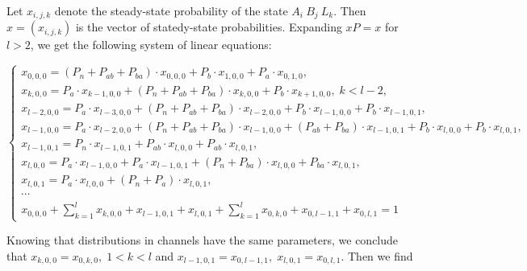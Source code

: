 Let $x_{i,j,k}$ denote the steady-state probability of the state $A_i \: B_j \: L_k$. Then $x = (x_{i,j,k})$ is the vector of statedy-state probabilities. Expanding $xP = x$ for $l>2$, we get the following system of linear equations:

\begin{equation}
\begin{cases}
    x_{0,0,0} = (P_n+P_{ab}+P_{ba}) \cdot x_{0,0,0} + P_b \cdot x_{1,0,0} + P_a \cdot x_{0,1,0},\\
    x_{k,0,0} = P_a \cdot x_{k-1,0,0} + (P_n+P_{ab}+P_{ba}) \cdot x_{k,0,0} + P_b \cdot x_{k+1,0,0}, \; k < l-2,\\
    x_{l-2,0,0} = P_a \cdot x_{l-3,0,0} + (P_n+P_{ab}+P_{ba}) \cdot x_{l-2,0,0} + P_b \cdot x_{l-1,0,0} + P_b \cdot x_{l-1,0,1},\\
    x_{l-1,0,0} = P_a \cdot x_{l-2,0,0} + (P_n+P_{ab}+P_{ba}) \cdot x_{l-1,0,0} + (P_{ab}+P_{ba}) \cdot x_{l-1,0,1} + P_b \cdot x_{l,0,0} + P_b \cdot x_{l,0,1},\\
    x_{l-1,0,1} = P_n \cdot x_{l-1,0,1} + P_{ab} \cdot x_{l,0,0} + P_{ab} \cdot x_{l,0,1},\\
    x_{l,0,0} = P_a \cdot x_{l-1,0,0} + P_a \cdot x_{l-1,0,1} + (P_n+P_{ba}) \cdot x_{l,0,0} + P_{ba} \cdot x_{l,0,1},\\
    x_{l,0,1} = P_a \cdot x_{l,0,0} + (P_n+P_a) \cdot x_{l,0,1},\\
    \cdots\\
    x_{0,0,0} + \sum_{k=1}^{l} x_{k,0,0} + x_{l-1,0,1} + x_{l,0,1} + \sum_{k=1}^{l} x_{0,k,0} + x_{0,l-1,1} + x_{0,l,1} = 1
\end{cases}
\end{equation}

Knowing that distributions in channels have the same parameters, we conclude that $x_{k,0,0} = x_{0,k,0}, \; 1<k<l$ and $x_{l-1,0,1}=x_{0,l-1,1}, \; x_{l,0,1}=x_{0,l,1}$. Then we find 
